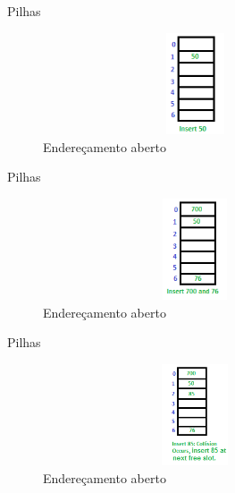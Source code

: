 \begin{frame}
	\begin{block}{Pilhas}
		\begin{figure}[!htb]
			\centering	  				
			\includegraphics[height=3cm, width = 9cm]{./pic/openAddressing12Linear.png}
			\caption{Endereçamento aberto}
			\label{fig_pilha}
		\end{figure}
	\end{block}
\end{frame}

\begin{frame}
	\begin{block}{Pilhas}
		\begin{figure}[!htb]
			\centering	  				
			\includegraphics[height=3cm, width = 9cm]{./pic/openAddressing13Linear.png}
			\caption{Endereçamento aberto}
			\label{fig_pilha}
		\end{figure}
	\end{block}
\end{frame}

\begin{frame}
	\begin{block}{Pilhas}
		\begin{figure}[!htb]
			\centering	  				
			\includegraphics[height=3cm, width = 9cm]{./pic/openAddressing14Linear.png}
			\caption{Endereçamento aberto}
			\label{fig_pilha}
		\end{figure}
	\end{block}
\end{frame}

